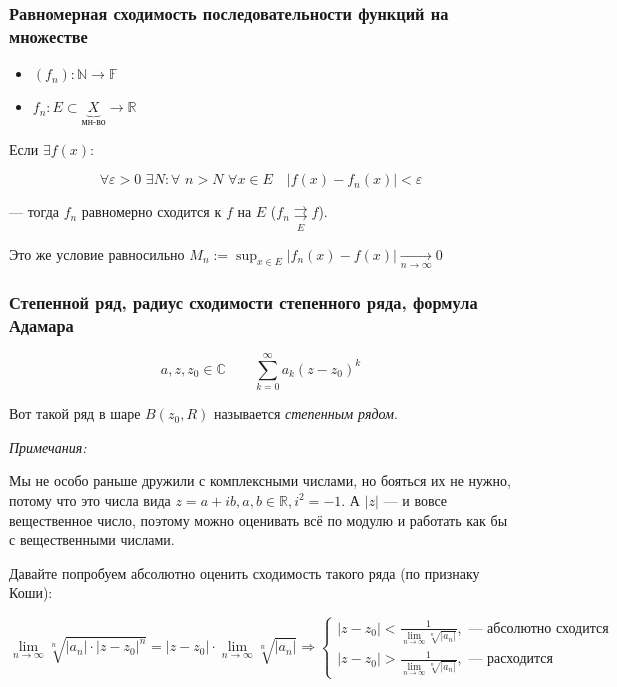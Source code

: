 \documentclass{article}
\def\dbl{\,\,}
\def\rsh#1{\underset{#1}{\rightrightarrows}}
\def\rshe{\rsh{E}}
\begin{document}
\subsubsection{Равномерная сходимость последовательности функций на множестве}

\begin{itemize}
    \item $(f_n): \mathbb{N} \rightarrow \mathbb{F}$
    \item $f_n: E \subset \underbrace{X}_{\text{мн-во}} \rightarrow \mathbb{R}$
\end{itemize}

Если $\exists f(x)$:

\[\forall \varepsilon > 0 \dbl \exists N: \forall \dbl n > N \dbl \forall x \in E \quad |f(x) - f_n(x)| < \varepsilon\]

--- тогда $f_n$ равномерно сходится к $f$ на $E$ ($f_n \rshe f$).

Это же условие равносильно $M_n := \sup_{x \in E} |f_n(x) - f(x)| \underset{n \rightarrow \infty}{\rightarrow} 0 $

\subsubsection{Степенной ряд, радиус сходимости степенного ряда, формула Адамара}

\[a, z, z_0 \in \mathbb{C} \qquad \sum_{k = 0}^{\infty} a_k (z - z_0)^k\]

Вот такой ряд в шаре $B(z_0, R)$ называется \textit{степенным рядом}. 

\textit{Примечания: }

Мы не особо раньше дружили с комплексными числами, но бояться их не нужно, потому что это числа вида $z = a + ib, a, b \in \mathbb{R}, i^2 = -1$. А $|z|$ --- и вовсе вещественное число, поэтому можно оценивать всё по модулю и работать как бы с вещественными числами.

Давайте попробуем абсолютно оценить сходимость такого ряда (по признаку Коши): 

\[\lim_{n \rightarrow \infty}{\sqrt[n]{|a_n| \cdot |z - z_0|^n}} = |z - z_0| \cdot \lim_{n \rightarrow \infty}\sqrt[n]{|a_n|} \Rightarrow \begin{cases}
    |z - z_0| < \frac{1}{\lim_{n \rightarrow \infty}\sqrt[n]{|a_n|}}, \text{ --- абсолютно сходится} \\
    |z - z_0| > \frac{1}{\lim_{n \rightarrow \infty}\sqrt[n]{|a_n|}}, \text{ --- расходится}
\end{cases}\]
\end{document}
